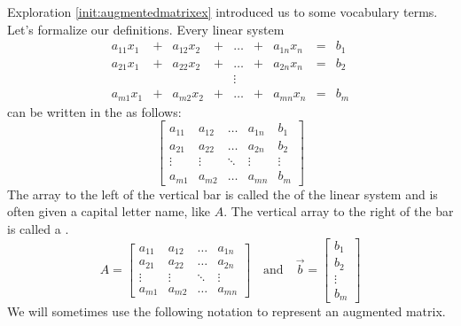 \documentclass{ximera}
\begin{document}
Exploration \ref{init:augmentedmatrixex} introduced us to some vocabulary terms.  Let's formalize our definitions.  Every linear system 
$$\begin{array}{ccccccccc}
      a_{11}x_1 &+ &a_{12}x_2&+&\ldots&+&a_{1n}x_n&= &b_1 \\
	 a_{21}x_1 &+ &a_{22}x_2&+&\ldots&+&a_{2n}x_n&= &b_2 \\
     &&&&\vdots&&&& \\
     a_{m1}x_1 &+ &a_{m2}x_2&+&\ldots&+&a_{mn}x_n&= &b_m
    \end{array}$$
    can be written in the  as follows:
    $$\left[\begin{array}{cccc|c}  
 a_{11}&a_{12}&\ldots&a_{1n}&b_1\\a_{21}&a_{22}&\ldots&a_{2n}&b_2\\\vdots&\vdots&\ddots&\vdots&\vdots\\a_{m1}&a_{m2}&\ldots&a_{mn}&b_m
 \end{array}\right]$$
 The array to the left of the vertical bar is called the  of the linear system and is often given a capital letter name, like $A$.  The vertical array to the right of the bar is called a .
 $$A=\begin{bmatrix}a_{11}&a_{12}&\ldots&a_{1n}\\a_{21}&a_{22}&\ldots&a_{2n}\\\vdots&\vdots&\ddots&\vdots\\a_{m1}&a_{m2}&\ldots&a_{mn}\end{bmatrix}\quad\text{and}\quad\vec{b}=\begin{bmatrix}b_1\\b_2\\\vdots\\b_m\end{bmatrix}$$
We will sometimes use the following notation to represent an augmented matrix.
\end{document}
